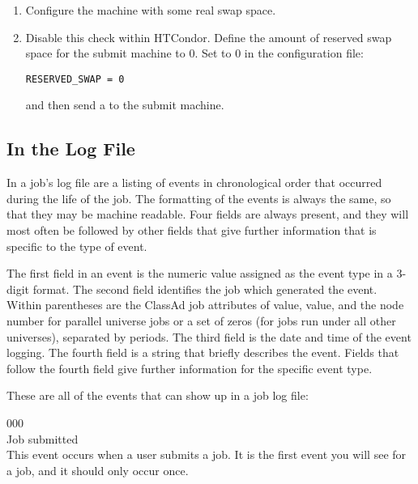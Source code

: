 \begin{enumerate}
\item Configure the machine with some real swap space.

\item Disable this check within HTCondor.
Define the amount of reserved swap space for the submit machine to 0.
Set  to 0 in the configuration file:

\begin{verbatim}
RESERVED_SWAP = 0
\end{verbatim}

and then send a  to the submit machine.
\end{enumerate}



\subsection{\label{sec:job-log-events}In the Log File}
In a job's log file are a listing of events in
chronological order that occurred during the life of the job.
The formatting of the events is always the same, 
so that they may be machine readable.
Four fields are always present,
and they will most often be followed by other fields that give further
information that is specific to the type of event.

The first field in an event is the numeric value assigned as the
event type in a 3-digit format.
The second field identifies the job which generated the event. 
Within parentheses are the ClassAd job attributes of
 value, 
 value, 
and the node number  for parallel universe jobs or a set of zeros
(for jobs run under all other universes),
separated by periods.
The third field is the date and time of the event logging.  
The fourth field is a string that briefly describes the event.
Fields that follow the fourth field give further information for the specific
event type.

These are all of the events that can show up in a job log file:

\noindent{} 000 \\
 Job submitted \\
 This event occurs when a user submits a job.
It is the first event you will see for a job, and it should only occur
once. 

